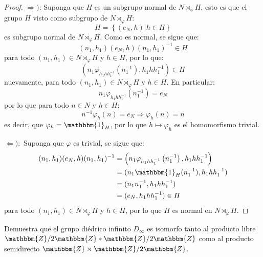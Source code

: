 \documentclass[12pt]{report}
\newcounter{it}
\theoremstyle{largebreak}
\newcommand{\bbm}[1]{\ensuremath{\mathbbm{#1}}}
\begin{document}
\begin{proof}
        $\Rightarrow)$: Suponga que $H$ es un subgrupo normal de $N\rtimes_\varphi H$, esto es que el grupo $H$ visto como subgrupo de $N\rtimes_\varphi H$:
        \begin{equation*}
            H=\left\{(e_N,h)\Big|h\in H \right\}
        \end{equation*}
        es subgrupo normal de $N\rtimes_\varphi H$. Como es normal, se sigue que:
        \begin{equation*}
            (n_1,h_1)(e_N,h)(n_1,h_1)^{-1}\in H
        \end{equation*}
        para todo $(n_1,h_1)\in N\rtimes_{\varphi}H$ y $h\in H$, por lo que:
        \begin{equation*}
            \left(n_1\varphi_{h_1h h_1^{-1}}\left(n_1^{-1}\right),h_1hh_1^{-1} \right)\in H
        \end{equation*}
        nuevamente, para todo $(n_1,h_1)\in N\rtimes_{\varphi}H$ y $h\in H$. En particular:
        \begin{equation*}
            n_1\varphi_{h_1h h_1^{-1}}\left(n_1^{-1}\right)=e_N
        \end{equation*}
        por lo que para todo $n\in N$ y $h\in H$:
        \begin{equation*}
            n^{-1}\varphi_{h}\left(n\right)=e_N\Rightarrow\varphi_h(n)=n
        \end{equation*}
        es decir, que $\varphi_h=\bbm{1}_H$, por lo que $h\mapsto \varphi_h$ es el homomorfismo trivial.
        
        $\Leftarrow):$ Suponga que $\varphi$ es trivial, se sigue que:
        \begin{equation*}
            \begin{split}
                (n_1,h_1)(e_N,h)(n_1,h_1)^{-1}&=\left(n_1\varphi_{h_1h h_1^{-1}}\left(n_1^{-1}\right),h_1hh_1^{-1} \right)\\
                &=(n_1\bbm{1}_H(n_1^{-1}),h_1hh_1^{-1})\\
                &=(n_1n_1^{-1},h_1hh_1^{-1})\\
                &=(e_N,h_1hh_1^{-1})\in H\\
            \end{split}
        \end{equation*}
        para todo $(n_1,h_1)\in N\rtimes_{\varphi}H$ y $h\in H$, por lo que $H$ es normal en $N\rtimes_{\varphi}H$.
    \end{proof}

    \begin{excer}
        Demuestra que el grupo diédrico infinito $D_\infty$ es isomorfo tanto al producto libre $\bbm{Z}/2\bbm{Z}*\bbm{Z}/2\bbm{Z}$ como al producto semidirecto $\bbm{Z}\rtimes\bbm{Z}/2\bbm{Z}$.
    \end{excer}
\end{document}
